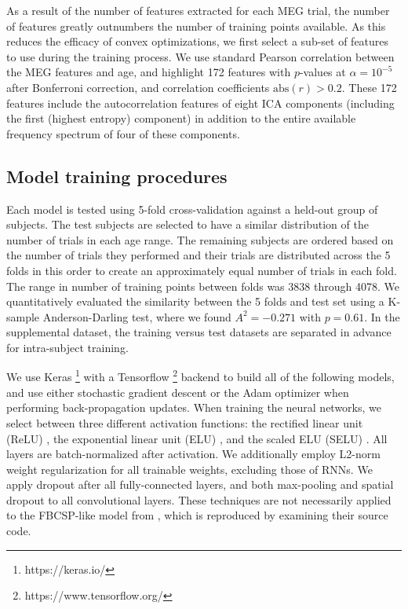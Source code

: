 \documentclass[fleqn,10pt]{wlscirep}
\begin{document}
As a result of the number of features extracted for each MEG trial, the number of features greatly outnumbers the number of training points available. As this reduces the efficacy of convex optimizations, we first select a sub-set of features to use during the training process. We use standard Pearson correlation between the MEG features and age, and highlight 172 features with $p$-values at $\alpha = 10^{-5}$ after Bonferroni correction, and correlation coefficients $\text{abs}(r) > 0.2$. These 172 features include the autocorrelation features of eight ICA components (including the first (highest entropy) component) in addition to the entire available frequency spectrum of four of these components.

\subsection*{Model training procedures} \label{sec:train_proc}

Each model is tested using 5-fold cross-validation against a held-out group of subjects. The test subjects are selected to have a similar distribution of the number of trials in each age range. The remaining subjects are ordered based on the number of trials they performed and their trials are distributed across the 5 folds in this order to create an approximately equal number of trials in each fold. The range in number of training points between folds was 3838 through 4078. We quantitatively evaluated the similarity between the 5 folds and test set using a K-sample Anderson-Darling test, where we found $A^2=-0.271$ with $p=0.61$. In the supplemental dataset, the training versus test datasets are separated in advance for intra-subject training.

We use Keras \footnote{https://keras.io/} with a Tensorflow \footnote{https://www.tensorflow.org/} backend to build all of the following models, and use either stochastic gradient descent or the Adam optimizer\cite{Kingma2015} when performing back-propagation updates. When training the neural networks, we select between three different activation functions: the rectified linear unit (ReLU) \cite{He2015a}, the exponential linear unit (ELU) \cite{Clevert}, and the scaled ELU (SELU) \cite{NIPS2017_6698}. All layers are batch-normalized \cite{Szegedy2015} after activation. We additionally employ L2-norm weight regularization for all trainable weights, excluding those of RNNs. We apply dropout \cite{Srivastava2014} after all fully-connected layers, and both max-pooling and spatial dropout \cite{Tompson2015} to all convolutional layers. These techniques are not necessarily applied to the FBCSP-like model from \cite{Schirrmeister2017}, which is reproduced by examining their source code.
\end{document}

